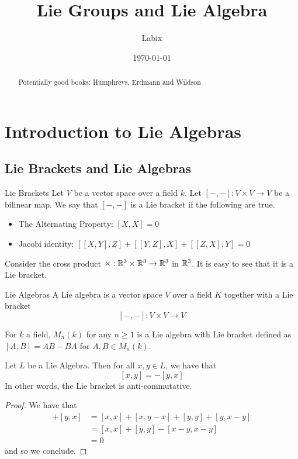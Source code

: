 \documentclass[a4paper]{article}
\title{Lie Groups and Lie Algebra}
\author{Labix}
\date{\today}
\begin{document}
\maketitle
\begin{abstract}
Potentially good books: Humphreys, Erdmann and Wildson
\end{abstract}
\pagebreak
\tableofcontents
\pagebreak

\section{Introduction to Lie Algebras}
\subsection{Lie Brackets and Lie Algebras}
\begin{defn}{Lie Brackets}{} Let $V$ be a vector space over a field $k$. Let $[-,-]:V\times V\to V$ be a bilinear map. We say that $[-,-]$ is a Lie bracket if the following are true. 
\begin{itemize}
\item The Alternating Property: $[X,X]=0$
\item Jacobi identity: $[[X,Y],Z]+[[Y,Z],X]+[[Z,X],Y]=0$
\end{itemize}
\end{defn}

Consider the cross product $\times:\mathbb{R}^3\times\mathbb{R}^3\to\mathbb{R}^3$ in $\mathbb{R}^3$. It is easy to see that it is a Lie bracket. 

\begin{defn}{Lie Algebras}{} A Lie algebra is a vector space $V$ over a field $K$ together with a Lie bracket $$[-,-]:V\times V\to V$$
\end{defn}

For $k$ a field, $M_n(k)$ for any $n\geq 1$ is a Lie algebra with Lie bracket defined as $[A,B]=AB-BA$ for $A,B\in M_n(k)$. 

\begin{lmm}{}{} Let $L$ be a Lie Algebra. Then for all $x,y\in L$, we have that $$[x,y]=-[y,x]$$ In other words, the Lie bracket is anti-commutative. \tcbline
\begin{proof}
We have that 
\begin{align*}
[x,y]+[y,x]&=[x,x]+[x,y-x]+[y,y]+[y,x-y]\tag{Bilinearity}\\
&=[x,x]+[y,y]-[x-y,x-y]\tag{Bilinearity}\\
&=0\tag{Alternating}
\end{align*}
and so we conclude. 
\end{proof}
\end{lmm}
\end{document}
